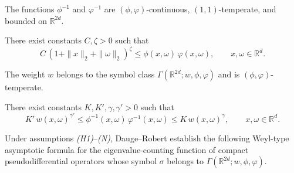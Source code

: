 \documentclass[a4paper,12pt]{article}
\let\originalleft\left
\let\originalright\right
\renewcommand{\left}{\mathopen{}\mathclose\bgroup\originalleft}
\renewcommand{\right}{\aftergroup\egroup\originalright}
\newcommand{\N}{\mathbb{N}}
\newcommand{\R}{\mathbb{R}}
\newcommand{\diff}{\mathop{}\!d}
\newcommand{\symbolnot}{\sigma}
\newlength{\mylabelwidth}
\newenvironment{citemize}
  {\begin{list}{}%
     {\setlength{\labelwidth}{\mylabelwidth}%
      \setlength{\leftmargin}{\dimexpr\labelwidth+\labelsep\relax}%
      \renewcommand{\makelabel}[1]{\makebox[\labelwidth][c]{##1}}}}
  {\end{list}}
\begin{document}
\begin{citemize}
    \item[(H1)]
    The functions \(\phi^{-1}\) and \(\varphi^{-1}\) are
    \((\phi,\varphi)\)-continuous, \((1,1)\)-temperate, and bounded on
    \(\R^{2d}\).

    \item[(H2)]
    There exist constants \(C,\zeta>0\) such that
    \begin{equation}\label{eq:DR-H2}
        C\,(1+\|x\|_2+\|\omega\|_2)^{\zeta}
        \le \phi(x,\omega)\,\varphi(x,\omega),
        \qquad x,\omega\in\R^{d}.
    \end{equation}

    \item[(W)]
    The weight \(w\) belongs to the symbol class
    \(\Gamma(\R^{2d};w,\phi,\varphi)\) and is
    \((\phi,\varphi)\)-temperate.

    \item[(N)]
    There exist constants \(K,K',\gamma,\gamma'>0\) such that
    \begin{equation}\label{eq:DR-N}
        K'\,w(x,\omega)^{\gamma'}
        \le \phi^{-1}(x,\omega)\,\varphi^{-1}(x,\omega)
        \le K\,w(x,\omega)^{\gamma},
        \qquad x,\omega\in\R^{d}.
    \end{equation}
\end{citemize}

Under assumptions \emph{(H1)}–\emph{(N)}, Dauge–Robert establish the following Weyl-type
asymptotic formula for the eigenvalue-counting function of compact
pseudodifferential operators whose symbol
$\sigma$ belongs to $\Gamma(\R^{2d}; w, \phi, \varphi)$.

\end{document}
